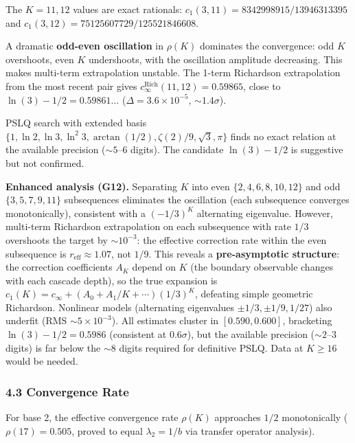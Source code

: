 \documentclass[
  11pt,
]{article}
\begin{document}
The \(K = 11, 12\) values are exact rationals:
\(c_1(3, 11) = 8342998915 / 13946313395\) and
\(c_1(3, 12) = 75125607729 / 125521846608\).

A dramatic \textbf{odd-even oscillation} in \(\rho(K)\) dominates the
convergence: odd \(K\) overshoots, even \(K\) undershoots, with the oscillation
amplitude decreasing. This makes multi-term extrapolation unstable. The 1-term
Richardson extrapolation from the most recent pair gives
\(c_\infty^{\text{Rich}}(11, 12) = 0.59865\), close to
\(\ln(3) - 1/2 = 0.59861\ldots\) (\(\Delta = 3.6 \times 10^{-5}\),
\(\sim 1.4\sigma\)).

PSLQ search with extended basis
\(\lbrace{}1, \ln 2, \ln 3, \ln^2 3, \arctan(1/2), \zeta(2)/9, \sqrt{3}, \pi\rbrace{}\)
finds no exact relation at the available precision (\(\sim 5\)--\(6\) digits).
The candidate \(\ln(3) - 1/2\) is suggestive but not confirmed.

\textbf{Enhanced analysis (G12).} Separating \(K\) into even
\(\lbrace{}2,4,6,8,10,12\rbrace{}\) and odd \(\lbrace{}3,5,7,9,11\rbrace{}\)
subsequences eliminates the oscillation (each subsequence converges
monotonically), consistent with a \((-1/3)^K\) alternating eigenvalue. However,
multi-term Richardson extrapolation on each subsequence with rate \(1/3\)
overshoots the target by \(\sim 10^{-3}\): the effective correction rate within
the even subsequence is \(r_{\text{eff}} \approx 1.07\), not \(1/9\). This
reveals a \textbf{pre-asymptotic structure}: the correction coefficients \(A_K\)
depend on \(K\) (the boundary observable changes with each cascade depth), so
the true expansion is \(c_1(K) = c_\infty + (A_0 + A_1/K + \cdots)(1/3)^K\),
defeating simple geometric Richardson. Nonlinear models (alternating eigenvalues
\(\pm 1/3, \pm 1/9, 1/27\)) also underfit (RMS \(\sim 5 \times 10^{-3}\)). All
estimates cluster in \([0.590, 0.600]\), bracketing \(\ln(3) - 1/2 = 0.5986\)
(consistent at \(0.6\sigma\)), but the available precision (\(\sim 2\)--\(3\)
digits) is far below the \(\sim 8\) digits required for definitive PSLQ. Data at
\(K \geq 16\) would be needed.

\subsubsection{4.3 Convergence Rate}\label{convergence-rate}

For base 2, the effective convergence rate \(\rho(K)\) approaches \(1/2\)
monotonically (\(\rho(17) = 0.505\), proved to equal \(\lambda_2 = 1/b\) via
transfer operator analysis).
\end{document}
